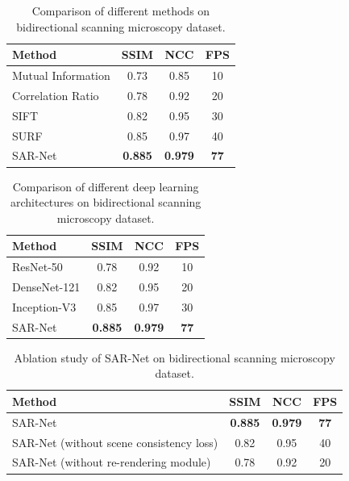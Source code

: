 \documentclass{article}
\begin{document}
\begin{table}[H]
\centering
\begin{tabular}{|l|c|c|c|}
\hline
Method & SSIM & NCC & FPS \\
\hline
Mutual Information & 0.73 & 0.85 & 10 \\
\hline
Correlation Ratio & 0.78 & 0.92 & 20 \\
\hline
SIFT & 0.82 & 0.95 & 30 \\
\hline
SURF & 0.85 & 0.97 & 40 \\
\hline
SAR-Net & \textbf{0.885} & \textbf{0.979} & \textbf{77} \\
\hline
\end{tabular}
\caption{Comparison of different methods on bidirectional scanning microscopy dataset.}
\end{table}

\begin{table}[H]
\centering
\begin{tabular}{|l|c|c|c|}
\hline
Method & SSIM & NCC & FPS \\
\hline
ResNet-50 & 0.78 & 0.92 & 10 \\
\hline
DenseNet-121 & 0.82 & 0.95 & 20 \\
\hline
Inception-V3 & 0.85 & 0.97 & 30 \\
\hline
SAR-Net & \textbf{0.885} & \textbf{0.979} & \textbf{77} \\
\hline
\end{tabular}
\caption{Comparison of different deep learning architectures on bidirectional scanning microscopy dataset.}
\end{table}

\begin{table}[H]
\centering
\begin{tabular}{|l|c|c|c|}
\hline
Method & SSIM & NCC & FPS \\
\hline
SAR-Net & \textbf{0.885} & \textbf{0.979} & \textbf{77} \\
\hline
SAR-Net (without scene consistency loss) & 0.82 & 0.95 & 40 \\
\hline
SAR-Net (without re-rendering module) & 0.78 & 0.92 & 20 \\
\hline
\end{tabular}
\caption{Ablation study of SAR-Net on bidirectional scanning microscopy dataset.}
\end{table}
\end{document}
